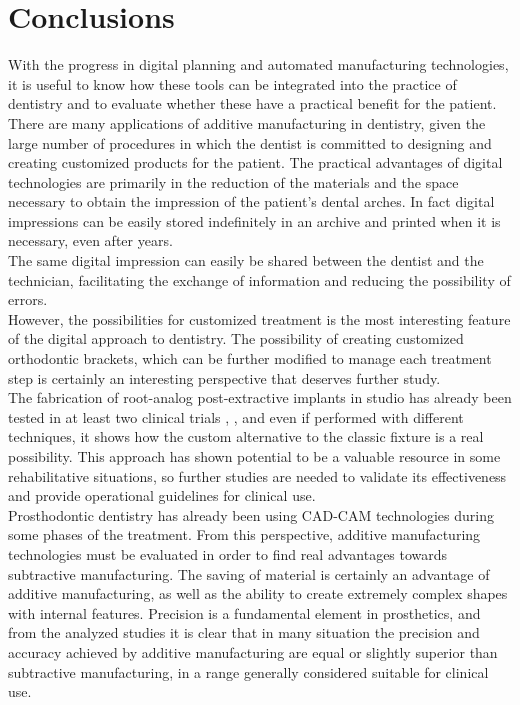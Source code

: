 
\chapter{Conclusions} %

\label{Conclusions} %

 
 
With the progress in digital planning and automated manufacturing technologies, it is useful to know how these tools can be integrated into the practice of dentistry and to evaluate whether these have a practical benefit for the patient.\\
There are many applications of additive manufacturing in dentistry, given the large number of procedures in which the dentist is committed to designing and creating customized products for the patient. The practical advantages of digital technologies are primarily in the reduction of the materials and the space necessary to obtain the impression of the patient's dental arches. In fact digital impressions can be easily stored indefinitely in an archive and printed when it is necessary, even after years. \\
The same digital impression can easily be shared between the dentist and the technician, facilitating the exchange of information and reducing the possibility of errors.\\
However, the possibilities for customized treatment is the most interesting feature of the digital approach to dentistry. The possibility of creating customized orthodontic brackets, which can be further modified to manage each treatment step is certainly an interesting perspective that deserves further study. \\ The fabrication of root-analog post-extractive implants in studio has already been tested in at least two clinical trials \parencite{Reference85}, \parencite{Reference87}, and even if performed with different techniques, it shows how the custom alternative to the classic fixture is a real possibility. This approach has shown potential to be a valuable resource in some rehabilitative situations, so further studies are needed to validate its effectiveness and provide operational guidelines for clinical use.\\
Prosthodontic dentistry has already been using CAD-CAM technologies during some phases of the treatment. From this perspective, additive manufacturing technologies must be evaluated in order to find real advantages towards subtractive manufacturing. The saving of material is certainly an advantage of additive manufacturing, as well as the ability to create extremely complex shapes with internal features. Precision is a fundamental element in prosthetics, and from the analyzed studies it is clear that in many situation the precision and accuracy achieved by additive manufacturing are equal or slightly superior than subtractive manufacturing, in a range generally considered suitable for clinical use. \\
